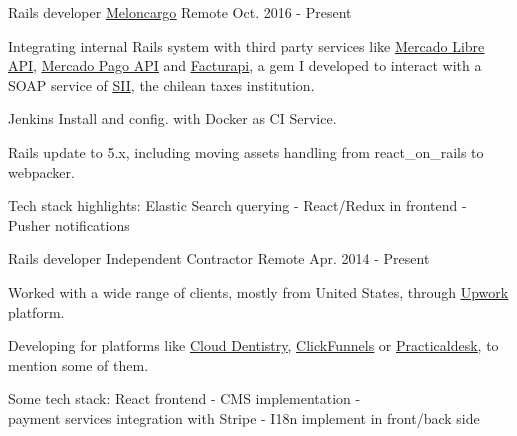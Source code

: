 
\begin{cventries}

  \cventry
    {Rails developer} %
    {\href{http://www.meloncargo.com/}{\underline{Meloncargo}}} %
    {Remote} %
    {Oct. 2016 - Present} %
    {
      \begin{cvitems} %
        \item { Integrating internal Rails system with third party services like
                \href{http://developers.mercadolibre.com/}{\underline{Mercado Libre API}},
                \href{https://www.mercadopago.com.br/developers/es/api-docs/}{\underline{Mercado Pago API}}
                and \href{https://github.com/alagos/facturapi}{\underline{Facturapi}},
                a gem I developed to interact with a SOAP service of \href{http://www.sii.cl}{\underline{SII}},
                the chilean taxes institution. }
        \item { Jenkins Install and config. with Docker as CI Service. }
        \item { Rails update to 5.x, including moving assets handling from react\_on\_rails to webpacker. }
        \item { Tech stack highlights: Elastic Search querying - React/Redux in frontend - Pusher notifications }
      \end{cvitems}
    }

  \cventry
    {Rails developer} %
    {Independent Contractor} %
    {Remote} %
    {Apr. 2014 - Present} %
    {
      \begin{cvitems} %
        \item { Worked with a wide range of clients, mostly from United States, through
                \href{https://www.upwork.com/freelancers/~0165692cc0b947512e}{\underline{Upwork}} platform.}
        \item { Developing for platforms like
                \href{https://www.clouddentistry.com/}{\underline{Cloud Dentistry}},
                \href{https://www.clickfunnels.com/}{\underline{ClickFunnels}} or
                \href{https://practicaldesk.com/}{\underline{Practicaldesk}},
                to mention some of them.}
        \item { Some tech stack: React frontend - CMS implementation - \\
                payment services integration with Stripe - I18n implement in front/back side}
      \end{cvitems}
    }


\end{cventries}
